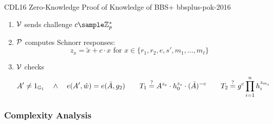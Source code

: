 \begin{protocol}{CDL16 Zero-Knowledge Proof of Knowledge of BBS+  \cite{camenisch_anonymous_2016}}{bbsplus-pok-2016}
\begin{enumerate}
\begin{itemize}
        \end{itemize}

    \item $\mathcal{V}$ sends challenge $c \sample \Z_p^*$\

    \item $\mathcal{P}$ computes Schnorr responses:
         \[
         z_x = \tilde{x} + c \cdot x \text{ for } x \in \{r_1, r_2, e, s', m_1, \ldots, m_{\ell}\}
         \]
 
    \item $\mathcal{V}$ checks
        \[
            A' \neq 1_{\mathbb{G}_1} \quad \wedge \quad e(A',\hat{w}) = e(\Bar{A},g_2) \qquad T_1 \stackrel{?}{=} A^{z_e} \cdot h_0^{z_s} \cdot (\Bar{A})^{-c} \qquad T_2 \stackrel{?}{=} g^c\prod_{i=1}^n h_i^{z_{m_i}}
        \]
    \end{enumerate}
\end{protocol}

\newpage
\subsubsection{Complexity Analysis}

